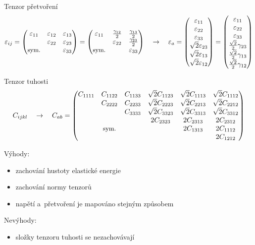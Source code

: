 Tenzor přetvoření
\begin{equation*}
\varepsilon_{ij} =
\begin{pmatrix}
\varepsilon_{11} & \varepsilon_{12} & \varepsilon_{13} \\ & \varepsilon_{22} & \varepsilon_{23} \\ \text{\small sym.} & & \varepsilon_{33} \\
\end{pmatrix} =
\begin{pmatrix}
\varepsilon_{11} & \frac{\gamma_{12}}{2} & \frac{\gamma_{13}}{2} \\ & \varepsilon_{22} & \frac{\gamma_{23}}{2} \\ \text{\small sym.} & & \varepsilon_{33} \\
\end{pmatrix}
\quad\rightarrow\quad
\varepsilon_{a} =
\begin{pmatrix}
\varepsilon_{11} \\ \varepsilon_{22} \\ \varepsilon_{33} \\ \sqrt{2} \varepsilon_{23} \\ \sqrt{2} \varepsilon_{13} \\ \sqrt{2} \varepsilon_{12} \\
\end{pmatrix} =
\begin{pmatrix}
\varepsilon_{11} \\ \varepsilon_{22} \\ \varepsilon_{33} \\ \frac{\sqrt{2}}{2} \gamma_{23} \\ \frac{\sqrt{2}}{2} \gamma_{13} \\ \frac{\sqrt{2}}{2} \gamma_{12} \\
\end{pmatrix}
\end{equation*}

Tenzor tuhosti
\begin{equation*}
C_{ijkl}
\quad\rightarrow\quad
C_{ab} =
\begin{pmatrix}
C_{1111} & C_{1122} & C_{1133} & \sqrt{2} C_{1123} & \sqrt{2} C_{1113} & \sqrt{2} C_{1112} \\
& C_{2222} & C_{2233} & \sqrt{2} C_{2223} & \sqrt{2} C_{2213} & \sqrt{2} C_{2212} \\
&          & C_{3333} & \sqrt{2} C_{3323} & \sqrt{2} C_{3313} & \sqrt{2} C_{3312} \\
&          &          & 2 C_{2323} & 2 C_{2313} & 2 C_{2312} \\
& \text{\small sym.} &          &          & 2 C_{1313} & 2 C_{1112} \\
&          &          &          &          & 2 C_{1212} \\
\end{pmatrix}
\end{equation*}

Výhody:
\begin{itemize}
	\item zachování hustoty elastické energie
	\item zachování normy tenzorů
	\item napětí a~přetvoření je mapováno stejným způsobem
\end{itemize}

Nevýhody:
\begin{itemize}
	\item složky tenzoru tuhosti se nezachovávají
\end{itemize}
